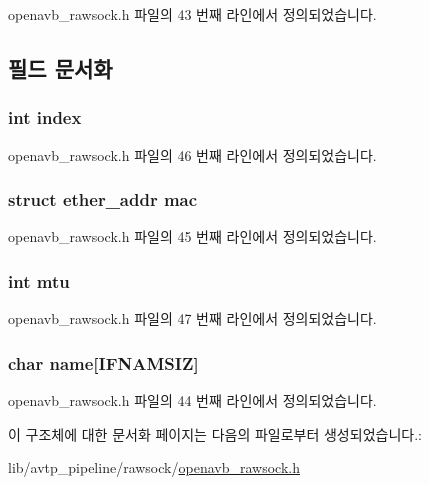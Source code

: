 openavb\+\_\+rawsock.\+h 파일의 43 번째 라인에서 정의되었습니다.



\subsection{필드 문서화}
\subsubsection[{\texorpdfstring{index}{index}}]{\setlength{\rightskip}{0pt plus 5cm}int index}\hypertarget{structif__info__t_a750b5d744c39a06bfb13e6eb010e35d0}{}\label{structif__info__t_a750b5d744c39a06bfb13e6eb010e35d0}


openavb\+\_\+rawsock.\+h 파일의 46 번째 라인에서 정의되었습니다.

\subsubsection[{\texorpdfstring{mac}{mac}}]{\setlength{\rightskip}{0pt plus 5cm}struct ether\+\_\+addr mac}\hypertarget{structif__info__t_a42d8b5e2d1a2c12771953cdf097f7173}{}\label{structif__info__t_a42d8b5e2d1a2c12771953cdf097f7173}


openavb\+\_\+rawsock.\+h 파일의 45 번째 라인에서 정의되었습니다.

\subsubsection[{\texorpdfstring{mtu}{mtu}}]{\setlength{\rightskip}{0pt plus 5cm}int mtu}\hypertarget{structif__info__t_a5f8594e356005c64e4a2625755b6c849}{}\label{structif__info__t_a5f8594e356005c64e4a2625755b6c849}


openavb\+\_\+rawsock.\+h 파일의 47 번째 라인에서 정의되었습니다.

\subsubsection[{\texorpdfstring{name}{name}}]{\setlength{\rightskip}{0pt plus 5cm}char name\mbox{[}{\bf I\+F\+N\+A\+M\+S\+IZ}\mbox{]}}\hypertarget{structif__info__t_a9ea12d6fc5b2c586092468ee1a86162a}{}\label{structif__info__t_a9ea12d6fc5b2c586092468ee1a86162a}


openavb\+\_\+rawsock.\+h 파일의 44 번째 라인에서 정의되었습니다.



이 구조체에 대한 문서화 페이지는 다음의 파일로부터 생성되었습니다.\+:\begin{DoxyCompactItemize}
\item 
lib/avtp\+\_\+pipeline/rawsock/\hyperlink{openavb__rawsock_8h}{openavb\+\_\+rawsock.\+h}\end{DoxyCompactItemize}
